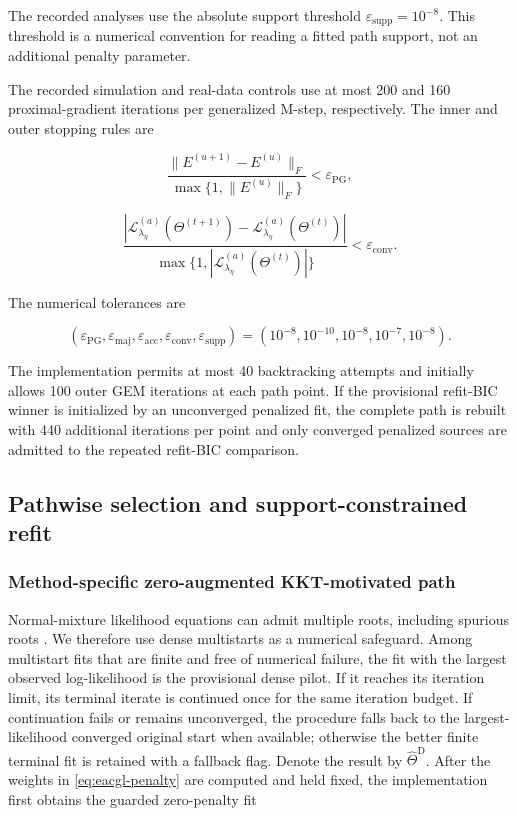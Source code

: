 \documentclass[preprint,12pt,authoryear]{elsarticle}
\begin{document}
The recorded analyses use the absolute support threshold
$\varepsilon_{\mathrm{supp}}=10^{-8}$. This threshold is a numerical convention
for reading a fitted path support, not an additional penalty parameter.

The recorded simulation and real-data controls use at most 200 and 160
proximal-gradient iterations per generalized M-step, respectively. The inner
and outer stopping rules are

\begin{equation}
\label{eq:pg-stopping}
\frac{\lVert E^{(u+1)}-E^{(u)}\rVert_F}
{\max\{1,\lVert E^{(u)}\rVert_F\}}
<\varepsilon_{\mathrm{PG}},
\end{equation}

\begin{equation}
\label{eq:gem-stopping}
\frac{|\mathcal L_{\lambda_\eta}^{(a)}(\Theta^{(t+1)})
-\mathcal L_{\lambda_\eta}^{(a)}(\Theta^{(t)})|}
{\max\{1,|\mathcal L_{\lambda_\eta}^{(a)}(\Theta^{(t)})|\}}
<\varepsilon_{\mathrm{conv}}.
\end{equation}

The numerical tolerances are

\[
(\varepsilon_{\mathrm{PG}},\varepsilon_{\mathrm{maj}},
\varepsilon_{\mathrm{acc}},\varepsilon_{\mathrm{conv}},
\varepsilon_{\mathrm{supp}})
=(10^{-8},10^{-10},10^{-8},10^{-7},10^{-8}).
\]

The implementation permits at most 40 backtracking attempts and initially
allows 100 outer GEM iterations at each path point. If the provisional
refit-BIC winner is initialized by an unconverged penalized fit, the complete
path is rebuilt with 440 additional iterations per point and only converged
penalized sources are admitted to the repeated refit-BIC comparison.

\subsection{Pathwise selection and support-constrained refit}

\subsubsection{Method-specific zero-augmented KKT-motivated path}

Normal-mixture likelihood equations can admit multiple roots, including
spurious roots \citep{seo2012root}. We therefore use dense multistarts as a
numerical safeguard.
Among multistart fits that are finite and free of numerical failure, the fit
with the largest observed log-likelihood is the provisional dense pilot. If it
reaches its iteration limit, its terminal
iterate is continued once for the same iteration budget. If continuation fails
or remains unconverged, the procedure falls back to the largest-likelihood
converged original start when available; otherwise the better finite terminal
fit is retained with a fallback flag. Denote the result by
$\widehat\Theta^{\mathrm D}$. After the weights in
\eqref{eq:eacgl-penalty} are computed and held fixed, the implementation first
obtains the guarded zero-penalty fit
\end{document}
